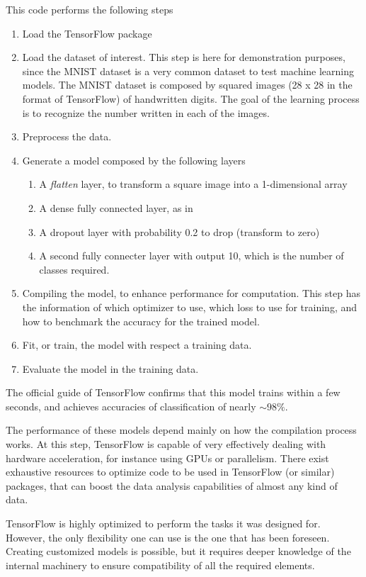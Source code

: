 \documentclass[]{report}
\begin{document}
This code performs the following steps
\begin{enumerate}
\item Load the TensorFlow package
\item Load the dataset of interest. This step is here for demonstration purposes, since the MNIST dataset is a very common dataset to test machine learning models. The MNIST dataset is composed by squared images (28 x 28 in the format of TensorFlow) of handwritten digits. The goal of the learning process is to recognize the number written in each of the images. 
\item Preprocess the data.
\item Generate a model composed by the following layers 
\begin{enumerate}
\item A \textit{flatten} layer, to transform a square image into a 1-dimensional array
\item A dense fully connected layer, as in 
\item A dropout layer with probability 0.2 to drop (transform to zero)
\item A second fully connecter layer with output 10, which is the number of classes required.
\end{enumerate}
\item Compiling the model, to enhance performance for computation. This step has the information of which optimizer to use, which loss to use for training, and how to benchmark the accuracy for the trained model. 
\item Fit, or train, the model with respect a training data. 
\item Evaluate the model in the training data. 
\end{enumerate}
The official guide of TensorFlow confirms that this model trains within a few seconds, and achieves accuracies of classification of nearly $\sim 98 \%$. 

The performance of these models depend mainly on how the compilation process works. At this step, TensorFlow is capable of very effectively dealing with hardware acceleration, for instance using GPUs or parallelism. There exist exhaustive resources to optimize code to be used in TensorFlow (or similar) packages, that can boost the data analysis capabilities of almost any kind of data. 

TensorFlow is highly optimized to perform the tasks it was designed for. However, the only flexibility one can use is the one that has been foreseen. Creating customized models is possible, but it requires deeper knowledge of the internal machinery to ensure compatibility of all the required elements. 
\end{document}
